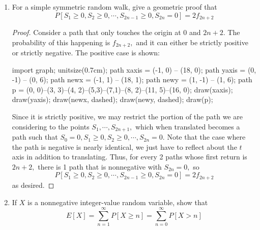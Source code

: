 \documentclass{article}
\begin{document}
\begin{enumerate}
	\item For a simple symmetric random walk, give a geometric proof that 
		\[P[S_1\ge 0, S_2\ge 0, \cdots, S_{2n-1}\ge 0, S_{2n}=0] = 2f_{2n+2}\]
		\begin{proof}
			Consider a path that only touches the origin at 0 and $2n+2.$ The probability of this happening is $f_{2n+2},$ and it can either be strictly positive or strictly negative. The positive case is shown:
			\begin{center}
				\begin{asy}
					import graph;
					unitsize(0.7cm);
					path xaxis = (-1, 0) -- (18, 0);
					path yaxis = (0, -1) -- (0, 6);
					path newx = (-1, 1) -- (18, 1);
					path newy = (1, -1) -- (1, 6);
					path p = (0, 0)--(3, 3)--(4, 2)--(5,3)--(7,1)--(8, 2)--(11, 5)--(16, 0);
					draw(xaxis);
					draw(yaxis);
					draw(newx, dashed);
					draw(newy, dashed);
					draw(p);
				\end{asy}
			\end{center}
			Since it is strictly positive, we may restrict the portion of the path we are considering to the points $S_1, \cdots, S_{2n+1},$ which when translated becomes a path such that $S_0= 0, S_1\ge 0, S_2\ge 0, \cdots, S_{2n}=0.$ Note that the case where the path is negative is nearly identical, we just have to reflect about the $t$ axis in addition to translating. Thus, for every 2 paths whose first return is $2n+2,$ there is 1 path that is nonnegative with $S_{2n}=0,$ so 
			\[P[S_1\ge 0, S_2\ge 0, \cdots, S_{2n-1}\ge 0, S_{2n}=0] = 2f_{2n+2}\]
			as desired.
		\end{proof}

	\item If $X$ is a nonnegative integer-value random variable, show that
		\[E[X] = \sum_{n=1}^{\infty} P[X\ge n] = \sum_{n=0}^{\infty}P[X>n]\]
		
\end{enumerate}
\end{document}
